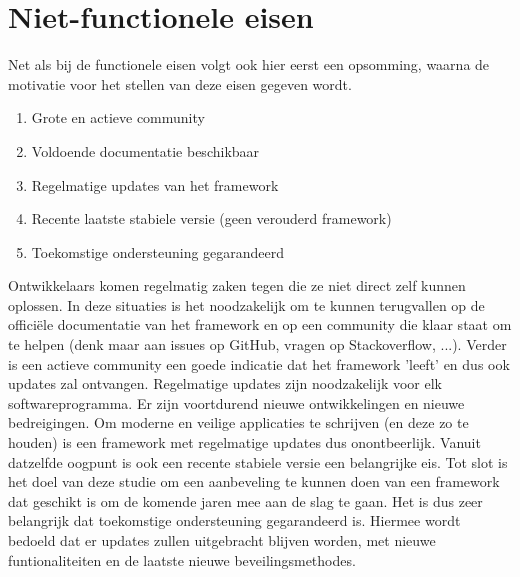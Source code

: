 \section{Niet-functionele eisen}

Net als bij de functionele eisen volgt ook hier eerst een opsomming, waarna de motivatie voor het stellen van deze eisen gegeven wordt.

\begin{enumerate}
    \item Grote en actieve community
    \item Voldoende documentatie beschikbaar
    \item Regelmatige updates van het framework
    \item Recente laatste stabiele versie (geen verouderd framework)
    \item Toekomstige ondersteuning gegarandeerd
\end{enumerate}

Ontwikkelaars komen regelmatig zaken tegen die ze niet direct zelf kunnen oplossen. In deze situaties is het noodzakelijk om te kunnen terugvallen op de officiële documentatie van het framework en op een community die klaar staat om te helpen (denk maar aan issues op GitHub, vragen op Stackoverflow, ...). Verder is een actieve community een goede indicatie dat het framework 'leeft' en dus ook updates zal ontvangen. Regelmatige updates zijn noodzakelijk voor elk softwareprogramma. Er zijn voortdurend nieuwe ontwikkelingen en nieuwe bedreigingen. Om moderne en veilige applicaties te schrijven (en deze zo te houden) is een framework met regelmatige updates dus onontbeerlijk. Vanuit datzelfde oogpunt is ook een recente stabiele versie een belangrijke eis. Tot slot is het doel van deze studie om een aanbeveling te kunnen doen van een framework dat geschikt is om de komende jaren mee aan de slag te gaan. Het is dus zeer belangrijk dat toekomstige ondersteuning gegarandeerd is. Hiermee wordt bedoeld dat er updates zullen uitgebracht blijven worden, met nieuwe funtionaliteiten en de laatste nieuwe beveilingsmethodes.